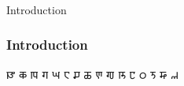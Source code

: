 \begin{frame}[fragile]\frametitle{}
\begin{center}
{\Large Introduction}
\end{center}
\end{frame}


\begin{frame}[fragile]\frametitle{Introduction}
{\sharadafont 𑆐	𑆑	𑆒	𑆓	𑆔	𑆕	𑆖	𑆗	𑆘	𑆙	𑆚	𑆛	𑆜	𑆝	𑆞	𑆟}

\end{frame}
